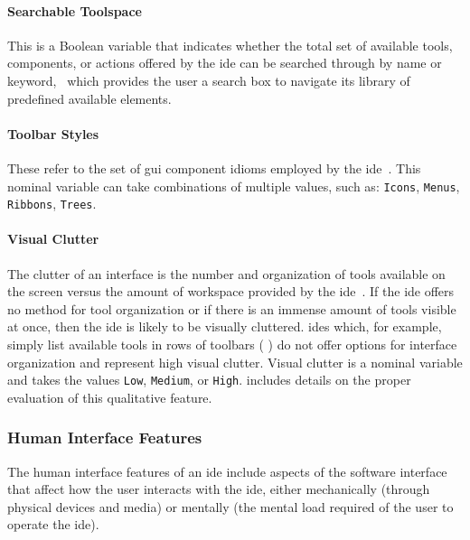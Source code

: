 \paragraph{Searchable Toolspace}
This is a Boolean variable that indicates whether the total set of
available tools, components, or actions offered by the \ac{ide} can be
searched through by name or keyword, \eg \cameleon~which provides the user
a search box to navigate its library of predefined available elements.


\paragraph{Toolbar Styles}
These refer to the set of \ac{gui} component idioms employed by the \ac{ide}~\cite{galitz2007}.
This nominal variable can take combinations of multiple values, such as:
\texttt{Icons}, \texttt{Menus}, \texttt{Ribbons}, \texttt{Trees}.


\paragraph{Visual Clutter}
The clutter of an interface is the number and organization of tools
available on the screen versus the amount of workspace provided by the
\ac{ide}~\cite{cooper2007,galitz2007}. If the \ac{ide} offers no method for
tool organization or if there is an immense amount of tools visible at
once, then the \ac{ide} is likely to be visually cluttered. \acp{ide}
which, for example, simply list available tools in rows of toolbars (\eg
{}) do not offer options for interface organization
and represent high visual clutter. Visual clutter is a nominal variable
and takes the values \texttt{Low}, \texttt{Medium}, or \texttt{High}.
 includes details on the proper evaluation of
this qualitative feature.


\subsubsection{Human Interface Features} \label{subsubsec:humaninterface}

The human interface features of an \ac{ide} include aspects of the software
interface that affect how the user interacts with the \ac{ide}, either
mechanically (\eg through physical devices and media) or mentally (\eg the
mental load required of the user to operate the \ac{ide}).


